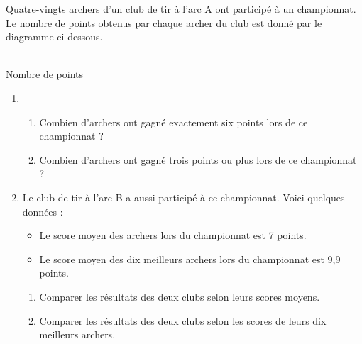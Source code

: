 \begin{colonne*exercice}
\begin{exercice} %
   Quatre-vingts archers d'un club de tir à l'arc A ont participé à un championnat. Le nombre de points obtenus par chaque archer du club est donné par le diagramme ci-dessous.
   \begin{center}
      {\footnotesize      
       \\ [-2mm]
   \hspace*{50mm} Nombre de points}
   \end{center}
   \vspace*{-10mm}
   \begin{enumerate}
      \item 
      \begin{enumerate}
         \item Combien d'archers ont gagné exactement six points lors de ce championnat ?
         \item Combien d'archers ont gagné trois points ou plus lors de ce championnat ?
      \end{enumerate}
      \item Le club de tir à l'arc B a aussi participé à ce championnat. Voici quelques données :
      \begin{itemize}
         \item Le score moyen des archers lors du championnat est 7 points.
         \item Le score moyen des dix meilleurs archers lors du championnat est 9,9 points. \\ [-10mm]
      \end{itemize}
      \begin{enumerate}
         \item Comparer les résultats des deux clubs selon leurs scores moyens.
         \item Comparer les résultats des deux clubs selon les scores de leurs dix meilleurs archers.
      \end{enumerate}
   \end{enumerate}
\end{exercice}


\end{colonne*exercice}
